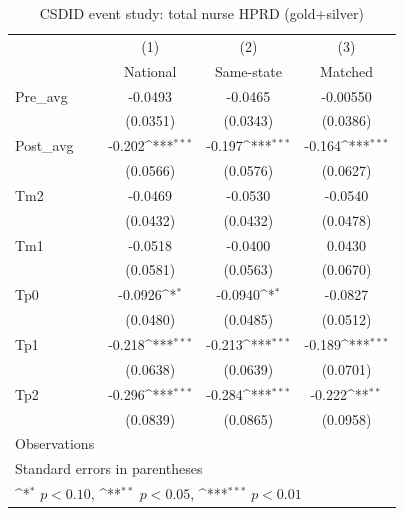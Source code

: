 \begin{table}[htbp]\centering
\def\sym#1{\ifmmode^{#1}\else\(^{#1}\)\fi}
\caption{CSDID event study: total nurse HPRD (gold+silver)}
\begin{tabular}{l*{3}{c}}
\hline\hline
                    &\multicolumn{1}{c}{(1)}&\multicolumn{1}{c}{(2)}&\multicolumn{1}{c}{(3)}\\
                    &\multicolumn{1}{c}{National}&\multicolumn{1}{c}{Same-state}&\multicolumn{1}{c}{Matched}\\
\hline
Pre\_avg             &     -0.0493         &     -0.0465         &    -0.00550         \\
                    &    (0.0351)         &    (0.0343)         &    (0.0386)         \\
[1em]
Post\_avg            &      -0.202\sym{***}&      -0.197\sym{***}&      -0.164\sym{***}\\
                    &    (0.0566)         &    (0.0576)         &    (0.0627)         \\
[1em]
Tm2                 &     -0.0469         &     -0.0530         &     -0.0540         \\
                    &    (0.0432)         &    (0.0432)         &    (0.0478)         \\
[1em]
Tm1                 &     -0.0518         &     -0.0400         &      0.0430         \\
                    &    (0.0581)         &    (0.0563)         &    (0.0670)         \\
[1em]
Tp0                 &     -0.0926\sym{*}  &     -0.0940\sym{*}  &     -0.0827         \\
                    &    (0.0480)         &    (0.0485)         &    (0.0512)         \\
[1em]
Tp1                 &      -0.218\sym{***}&      -0.213\sym{***}&      -0.189\sym{***}\\
                    &    (0.0638)         &    (0.0639)         &    (0.0701)         \\
[1em]
Tp2                 &      -0.296\sym{***}&      -0.284\sym{***}&      -0.222\sym{**} \\
                    &    (0.0839)         &    (0.0865)         &    (0.0958)         \\
\hline
Observations        &                     &                     &                     \\
\hline\hline
\multicolumn{4}{l}{\footnotesize Standard errors in parentheses}\\
\multicolumn{4}{l}{\footnotesize \sym{*} \(p<0.10\), \sym{**} \(p<0.05\), \sym{***} \(p<0.01\)}\\
\end{tabular}
\end{table}
